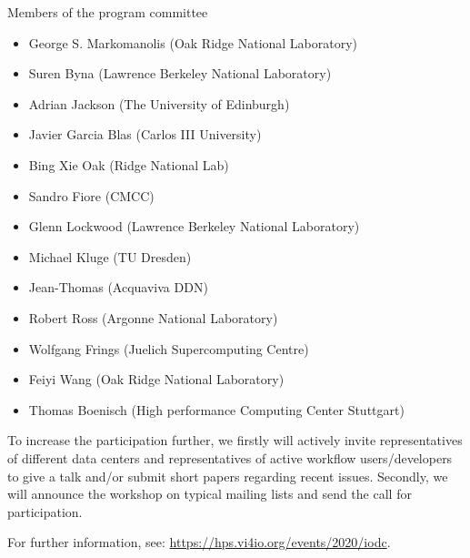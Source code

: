 \documentclass[a4paper,10pt]{article}
\begin{document}
Members of the program committee%
\begin{itemize}
  \item George S.	Markomanolis	(Oak Ridge National Laboratory)
  \item Suren	Byna	(Lawrence Berkeley National Laboratory)
  \item Adrian	Jackson	(The University of Edinburgh)
  \item Javier	Garcia Blas	(Carlos III University)
  \item Bing	Xie	Oak (Ridge National Lab)
  \item Sandro	Fiore	(CMCC)
  \item Glenn	Lockwood	(Lawrence Berkeley National Laboratory)
  \item Michael	Kluge	(TU Dresden)
  \item Jean-Thomas	(Acquaviva	DDN)
  \item Robert	Ross	(Argonne National Laboratory)
  \item Wolfgang	Frings	(Juelich Supercomputing Centre)
  \item Feiyi	Wang	(Oak Ridge National Laboratory)
  \item Thomas	Boenisch	(High performance Computing Center Stuttgart)
\end{itemize}

To increase the participation further, we firstly will actively invite representatives of different data centers and representatives of active workflow users/developers to give a talk and/or submit short papers regarding recent issues.
Secondly, we will announce the workshop on typical mailing lists and send the call for participation.


For further information, see:
\url{https://hps.vi4io.org/events/2020/iodc}.

\end{document}
